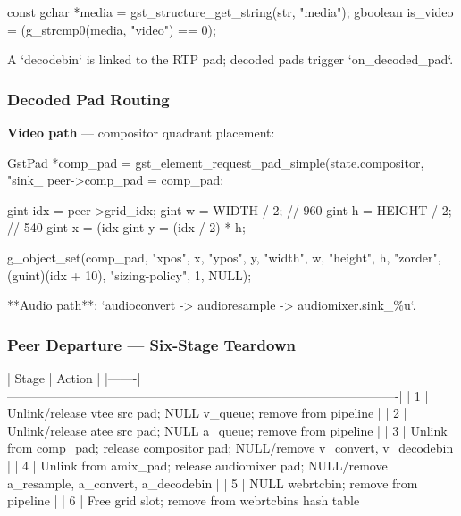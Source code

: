 \documentclass{article}
\let\originalfootnotesize\footnotesize
\let\oldverbatim\verbatim
\let\oldendverbatim\endverbatim
\renewenvironment{verbatim}{\originalfootnotesize\oldverbatim}{\oldendverbatim}
\begin{document}
\begin{verbatim}
const gchar *media = gst_structure_get_string(str, "media");
gboolean is_video = (g_strcmp0(media, "video") == 0);
\end{verbatim}

A `decodebin` is linked to the RTP pad; decoded pads trigger `on\_decoded\_pad`.

\subsubsection{Decoded Pad Routing}

\textbf{Video path} --- compositor quadrant placement:

\begin{verbatim}
GstPad *comp_pad = gst_element_request_pad_simple(state.compositor, "sink_%u");
peer->comp_pad = comp_pad;

gint idx = peer->grid_idx;
gint w = WIDTH / 2;   // 960
gint h = HEIGHT / 2;  // 540
gint x = (idx % 2) * w;
gint y = (idx / 2) * h;

g_object_set(comp_pad, "xpos", x, "ypos", y, "width", w, "height", h,
             "zorder", (guint)(idx + 10), "sizing-policy", 1, NULL);
\end{verbatim}

**Audio path**: `audioconvert -> audioresample -> audiomixer.sink\_\%u`.

\subsubsection{Peer Departure — Six-Stage Teardown}

\begin{verbatim}
| Stage | Action                                                                                       |
|-------|----------------------------------------------------------------------------------------------|
| 1     | Unlink/release vtee src pad; NULL v_queue; remove from pipeline                              |
| 2     | Unlink/release atee src pad; NULL a_queue; remove from pipeline                              |
| 3     | Unlink from comp_pad; release compositor pad; NULL/remove v_convert, v_decodebin             |
| 4     | Unlink from amix_pad; release audiomixer pad; NULL/remove a_resample, a_convert, a_decodebin |
| 5     | NULL webrtcbin; remove from pipeline                                                         |
| 6     | Free grid slot; remove from webrtcbins hash table                                            |
\end{verbatim}
\end{document}
